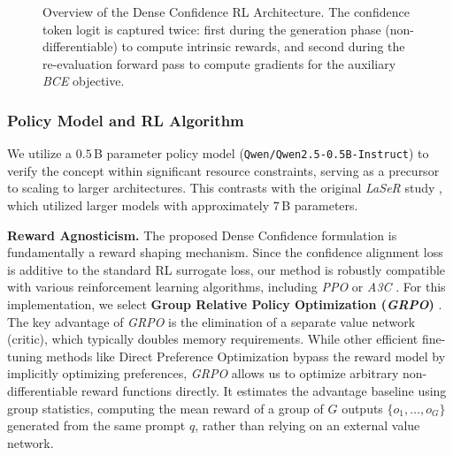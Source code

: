 \documentclass[a4paper,oneside,10pt,ngerman,english]{scrartcl}
\begin{document}
\begin{figure}[H]
{
	}
	\caption{Overview of the Dense Confidence RL Architecture. The confidence token logit is captured twice: first during the generation phase (non-differentiable) to compute intrinsic rewards, and second during the re-evaluation forward pass to compute gradients for the auxiliary \textit{BCE} objective.}
	\label{fig:architecture}
\end{figure}

\subsubsection{Policy Model and RL Algorithm}
We utilize a $0.5\,$B parameter policy model (\texttt{Qwen/Qwen2.5-0.5B-Instruct}) \citep{qwen25} to verify the concept within significant resource constraints, serving as a precursor to scaling to larger architectures. This contrasts with the original \textit{LaSeR} study \citep{laser}, which utilized larger models with approximately $7\,$B parameters.

\textbf{Reward Agnosticism.} The proposed Dense Confidence formulation is fundamentally a reward shaping mechanism. Since the confidence alignment loss is additive to the standard RL surrogate loss, our method is robustly compatible with various reinforcement learning algorithms, including \textit{PPO} \citep{ppo} or \textit{A3C} \citep{a3c}. For this implementation, we select \textbf{Group Relative Policy Optimization (\textit{GRPO})} \citep{deepseekmath}. The key advantage of \textit{GRPO} is the elimination of a separate value network (critic), which typically doubles memory requirements. While other efficient fine-tuning methods like Direct Preference Optimization \citep{directpreferenceopt} bypass the reward model by implicitly optimizing preferences, \textit{GRPO} allows us to optimize arbitrary non-differentiable reward functions directly. It estimates the advantage baseline using group statistics, computing the mean reward of a group of $G$ outputs $\{o_1, \dots, o_G\}$ generated from the same prompt $q$, rather than relying on an external value network.
\end{document}
